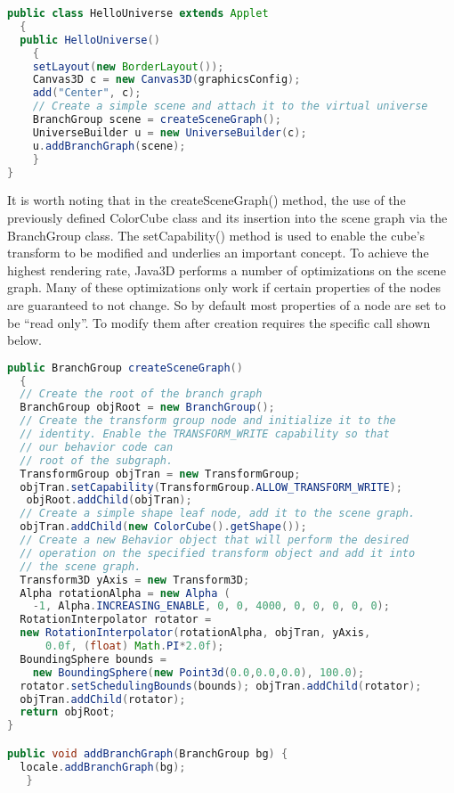 \begin{lstlisting}[language=Java, caption={}, numbers=none, frame=none]
public class HelloUniverse extends Applet
  {
  public HelloUniverse()
    {
    setLayout(new BorderLayout());
    Canvas3D c = new Canvas3D(graphicsConfig);
    add("Center", c);
    // Create a simple scene and attach it to the virtual universe
    BranchGroup scene = createSceneGraph();
    UniverseBuilder u = new UniverseBuilder(c);
    u.addBranchGraph(scene);
    }
}
\end{lstlisting}

It is worth noting that in the createSceneGraph() method, the use of the previously defined ColorCube class and its insertion into the scene graph via the BranchGroup class. The setCapability() method is used to enable the cube's transform to be modified and underlies an important concept. To achieve the highest rendering rate, Java3D performs a number of optimizations on the scene graph. Many of these optimizations only work if certain properties of the nodes are guaranteed to not change. So by default most properties of a node are set to be ``read only''. To modify them after creation requires the specific call shown below.

\begin{lstlisting}[language=Java, caption={}, numbers=none, frame=none]
public BranchGroup createSceneGraph()
  {
  // Create the root of the branch graph
  BranchGroup objRoot = new BranchGroup();
  // Create the transform group node and initialize it to the
  // identity. Enable the TRANSFORM_WRITE capability so that
  // our behavior code can
  // root of the subgraph.
  TransformGroup objTran = new TransformGroup;
  objTran.setCapability(TransformGroup.ALLOW_TRANSFORM_WRITE);
   objRoot.addChild(objTran);
  // Create a simple shape leaf node, add it to the scene graph.
  objTran.addChild(new ColorCube().getShape());
  // Create a new Behavior object that will perform the desired
  // operation on the specified transform object and add it into
  // the scene graph.
  Transform3D yAxis = new Transform3D;
  Alpha rotationAlpha = new Alpha (
    -1, Alpha.INCREASING_ENABLE, 0, 0, 4000, 0, 0, 0, 0, 0);
  RotationInterpolator rotator =
  new RotationInterpolator(rotationAlpha, objTran, yAxis,
      0.0f, (float) Math.PI*2.0f);
  BoundingSphere bounds =
    new BoundingSphere(new Point3d(0.0,0.0,0.0), 100.0);
  rotator.setSchedulingBounds(bounds); objTran.addChild(rotator);
  objTran.addChild(rotator);
  return objRoot;
}

public void addBranchGraph(BranchGroup bg) {
  locale.addBranchGraph(bg);
   }
\end{lstlisting}

